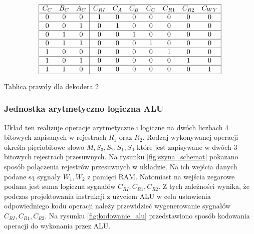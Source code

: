\documentclass[../main.tex]{subfiles}
\begin{document}
        \begin{table}[ht]
            \centering
            \[
            \begin{array}{|ccc|ccccccc|}
            \hline
            C_C & B_C & A_C & C_{RI} & C_A & C_B & C_C & C_{R1} & C_{R2} & C_{WY} \\ \hline
            0   & 0   & 0   & 1      & 0   & 0   & 0   & 0      & 0      & 0      \\ \hline
            0   & 0   & 1   & 0      & 1   & 0   & 0   & 0      & 0      & 0      \\ \hline
            0   & 1   & 0   & 0      & 0   & 1   & 0   & 0      & 0      & 0      \\ \hline
            0   & 1   & 1   & 0      & 0   & 0   & 1   & 0      & 0      & 0      \\ \hline
            1   & 0   & 0   & 0      & 0   & 0   & 0   & 1      & 0      & 0      \\ \hline
            1   & 0   & 1   & 0      & 0   & 0   & 0   & 0      & 1      & 0      \\ \hline
            1   & 1   & 0   & 0      & 0   & 0   & 0   & 0      & 0      & 1      \\ \hline
            \end{array}
            \]
            \caption{Tablica prawdy dla dekodera 2}
            \label{tab:odbiorniki}
        \end{table}

        \subsubsection*{Jednostka arytmetyczno logiczna ALU}
        
        Układ ten realizuje operacje arytmetyczne i logiczne na dwóch liczbach 4 bitowych zapisanych w rejestrach $R_1$ oraz $R_2$.
        Rodzaj wykonywanej operacji określa pięciobitowe słowo $M, S_3, S_2, S_1, S_0$ które jest zapisywane w dwóch 3 bitowych rejestrach przesuwnych.
        Na rysunku \ref{fig:szyna_schemat} pokazano sposób połączenia rejestrów przesuwnych w układzie. Na ich wejścia danych podane są 
        sygnały $W_1, W_2$ z pamięci RAM. Natomiast na wejścia zegarowe podana jest suma logiczna sygnałów $C_{RI}, C_{R1}, C_{R2}$. Z tych zależności
        wynika, że podczas projektowania instrukcji z użyciem ALU w celu ustawienia odpowiedniego kodu operacji należy przewidzieć 
        wygenerowanie sygnałów $C_{RI}, C_{R1}, C_{R2}$. Na rysunku \ref{fig:kodowanie_alu} przedstawiono sposób kodowania operacji do wykonania przez ALU.
\end{document}
